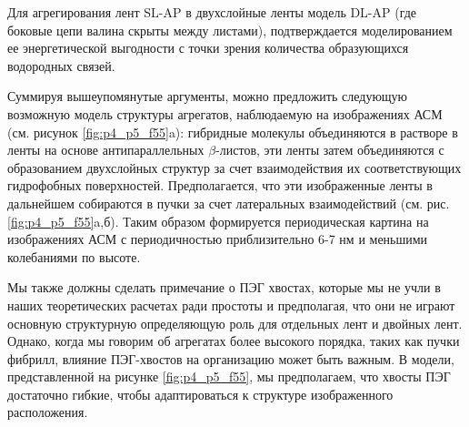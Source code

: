     Для агрегирования лент SL-AP в двухслойные ленты модель DL-AP (где боковые цепи валина скрыты между листами), подтверждается моделированием ее энергетической выгодности с точки зрения количества образующихся водородных связей.

    Суммируя вышеупомянутые аргументы, можно предложить следующую возможную модель структуры агрегатов, наблюдаемую на изображениях АСМ (см. рисунок \ref{fig:p4_p5_f55}a): гибридные молекулы объединяются в растворе в ленты на основе антипараллельных $\beta$-листов, эти ленты затем объединяются с образованием двухслойных структур за счет взаимодействия их соответствующих гидрофобных поверхностей. Предполагается, что эти изображенные ленты в дальнейшем собираются в пучки за счет латеральных взаимодействий (см. рис. \ref{fig:p4_p5_f55}a,б). Таким образом формируется периодическая картина на изображениях АСМ с периодичностью приблизительно 6-7 нм и меньшими колебаниями по высоте.

    Мы также должны сделать примечание о ПЭГ хвостах, которые мы не учли в наших теоретических расчетах ради простоты и предполагая, что они не играют основную структурную определяющую роль для отдельных лент и двойных лент. Однако, когда мы говорим об агрегатах более высокого порядка, таких как пучки фибрилл, влияние ПЭГ-хвостов на организацию может быть важным. В модели, представленной на рисунке \ref{fig:p4_p5_f55}, мы предполагаем, что хвосты ПЭГ достаточно гибкие, чтобы адаптироваться к структуре изображенного расположения.
    
